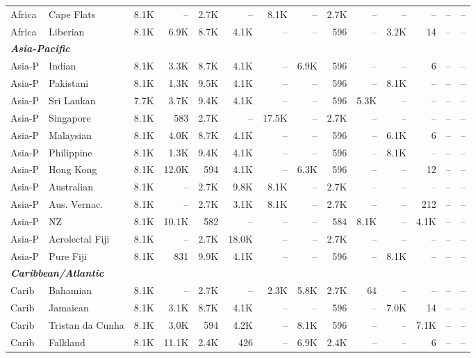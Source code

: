 \begin{table}[t]
{\begin{tabular}{llrrrrrrrrrrrr}
Africa & Cape Flats & 8.1K & -- & 2.7K & -- & 8.1K & -- & 2.7K & -- & -- & -- & -- & -- \\
Africa & Liberian & 8.1K & 6.9K & 8.7K & 4.1K & -- & -- & 596 & -- & 3.2K & 14 & -- & -- \\
\midrule
\multicolumn{14}{l}{\textit{\textbf{Asia-Pacific}}} \\
Asia-P & Indian & 8.1K & 3.3K & 8.7K & 4.1K & -- & 6.9K & 596 & -- & -- & 6 & -- & -- \\
Asia-P & Pakistani & 8.1K & 1.3K & 9.5K & 4.1K & -- & -- & 596 & -- & 8.1K & -- & -- & -- \\
Asia-P & Sri Lankan & 7.7K & 3.7K & 9.4K & 4.1K & -- & -- & 596 & 5.3K & -- & -- & -- & -- \\
Asia-P & Singapore & 8.1K & 583 & 2.7K & -- & 17.5K & -- & 2.7K & -- & -- & -- & -- & -- \\
Asia-P & Malaysian & 8.1K & 4.0K & 8.7K & 4.1K & -- & -- & 596 & -- & 6.1K & 6 & -- & -- \\
Asia-P & Philippine & 8.1K & 1.3K & 9.4K & 4.1K & -- & -- & 596 & -- & 8.1K & -- & -- & -- \\
Asia-P & Hong Kong & 8.1K & 12.0K & 594 & 4.1K & -- & 6.3K & 596 & -- & -- & 12 & -- & -- \\
Asia-P & Australian & 8.1K & -- & 2.7K & 9.8K & 8.1K & -- & 2.7K & -- & -- & -- & -- & -- \\
Asia-P & Aus. Vernac. & 8.1K & -- & 2.7K & 3.1K & 8.1K & -- & 2.7K & -- & -- & 212 & -- & -- \\
Asia-P & NZ & 8.1K & 10.1K & 582 & -- & -- & -- & 584 & 8.1K & -- & 4.1K & -- & -- \\
Asia-P & Acrolectal Fiji & 8.1K & -- & 2.7K & 18.0K & -- & -- & 2.7K & -- & -- & -- & -- & -- \\
Asia-P & Pure Fiji & 8.1K & 831 & 9.9K & 4.1K & -- & -- & 596 & -- & 8.1K & -- & -- & -- \\
\midrule
\multicolumn{14}{l}{\textit{\textbf{Caribbean/Atlantic}}} \\
Carib & Bahamian & 8.1K & -- & 2.7K & -- & 2.3K & 5.8K & 2.7K & 64 & -- & -- & -- & -- \\
Carib & Jamaican & 8.1K & 3.1K & 8.7K & 4.1K & -- & -- & 596 & -- & 7.0K & 14 & -- & -- \\
Carib & Tristan da Cunha & 8.1K & 3.0K & 594 & 4.2K & -- & 8.1K & 596 & -- & -- & 7.1K & -- & -- \\
Carib & Falkland & 8.1K & 11.1K & 2.4K & 426 & -- & 6.9K & 2.4K & -- & -- & 6 & -- & -- \\

\end{tabular}}
\end{table}
